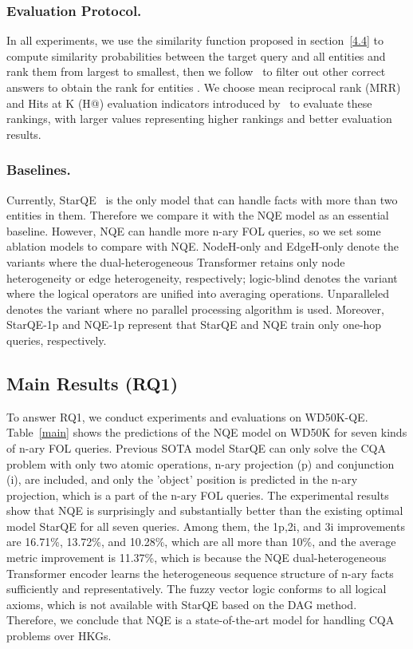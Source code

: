 \documentclass[letterpaper]{article} \usepackage{aaai23}  \usepackage{times}  \usepackage{helvet}  \usepackage{courier}  \usepackage[hyphens]{url}  \usepackage{graphicx} \urlstyle{rm} \def\UrlFont{\rm}  \usepackage{natbib}  \usepackage{caption} \frenchspacing  \setlength{\pdfpagewidth}{8.5in}  \setlength{\pdfpageheight}{11in}  \usepackage{algorithm}
\begin{document}
\subsubsection{Evaluation Protocol.}
In all experiments, we use the similarity function proposed in section~\ref{4.4} to compute similarity probabilities  between the target query  and all entities and rank them from largest to smallest, then we follow~\citet{TransE} to filter out other correct answers to obtain the rank  for entities . We choose mean reciprocal rank (MRR) and Hits at K (H@) evaluation indicators introduced by~\citet{TransE} to evaluate these rankings, with larger values representing higher rankings and better evaluation results.
\subsubsection{Baselines.}
Currently, StarQE~\citep{StarQE} is the only model that can handle facts with more than two entities in them. Therefore we compare it with the NQE model as an essential baseline. However, NQE can handle more n-ary FOL queries, so we set some ablation models to compare with NQE. NodeH-only and EdgeH-only denote the variants where the dual-heterogeneous Transformer retains only node heterogeneity or edge heterogeneity, respectively; logic-blind denotes the variant where the logical operators are unified into averaging operations. Unparalleled denotes the variant where no parallel processing algorithm is used. Moreover, StarQE-1p and NQE-1p represent that StarQE and NQE train only one-hop queries, respectively.

\subsection{Main Results (RQ1)} 
To answer RQ1, we conduct experiments and evaluations on WD50K-QE. Table~\ref{main} shows the predictions of the NQE model on WD50K for seven kinds of n-ary FOL queries. Previous SOTA model StarQE can only solve the CQA problem with only two atomic operations, n-ary projection (p) and conjunction (i), are included, and only the 'object' position is predicted in the n-ary projection, which is a part of the n-ary FOL queries. The experimental results show that NQE is surprisingly and substantially better than the existing optimal model StarQE for all seven queries. Among them, the 1p,2i, and 3i improvements are 16.71\%, 13.72\%, and 10.28\%, which are all more than 10\%, and the average metric improvement is 11.37\%, which is because the NQE dual-heterogeneous Transformer encoder learns the heterogeneous sequence structure of n-ary facts sufficiently and representatively. The fuzzy vector logic conforms to all logical axioms, which is not available with StarQE based on the DAG method. Therefore, we conclude that NQE is a state-of-the-art model for handling CQA problems over HKGs.
\end{document}
